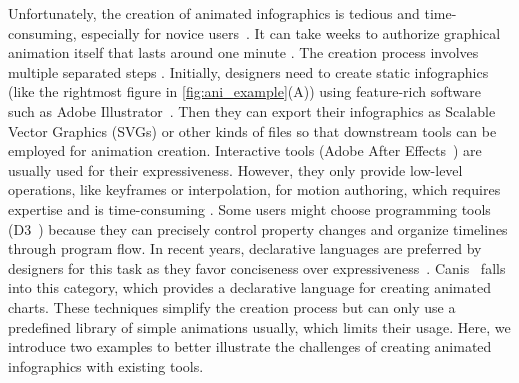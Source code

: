 Unfortunately, the creation of animated infographics is tedious and time-consuming, especially for novice users~\cite{amini2016authoring, hullman2013deeper, shi2021communicating}. %
It can take weeks to authorize graphical animation itself that lasts around one minute \cite{howlong}.
The creation process involves multiple separated steps \cite{jahanlou2020challenges, shi2021communicating}. %
Initially, designers need to create static infographics (like the rightmost figure in \autoref{fig:ani_example}(A)) using feature-rich software such as Adobe Illustrator~\cite{AdobeAI}.
Then they can export their infographics as Scalable Vector Graphics (SVGs) or other kinds of files so that downstream tools can be employed for animation creation.
Interactive tools (\eg Adobe After Effects~\cite{AdobeAE}) are usually used for their expressiveness.
However, they only provide low-level operations, like keyframes or interpolation, for motion authoring, which requires expertise and is time-consuming \cite{jahanlou2020challenges}.
Some users might choose programming tools (\eg D3~\cite{bostock2011d3}) because they can precisely control property changes and organize timelines through program flow.
In recent years, declarative languages are preferred by designers for this task as they favor conciseness over expressiveness~\cite{mcnutt2023nogrammar}. 
Canis~\cite{ge2020canis} falls into this category, which provides a declarative language for creating animated charts.
These techniques simplify the creation process but can only use a predefined library of simple animations usually, which limits their usage.
Here, we introduce two examples to better illustrate the challenges of creating animated infographics with existing tools.


